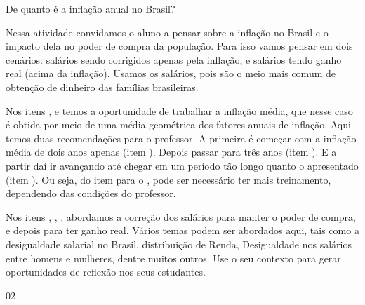 \begin{sugestions}{De quanto é a inflação anual no Brasil?}
{
Nessa atividade convidamos o aluno a pensar sobre a inflação no Brasil e o impacto dela no poder de compra da população. Para isso vamos pensar em dois cenários: salários sendo corrigidos apenas pela inflação, e salários tendo ganho real (acima da inflação). Usamos os salários, pois são o meio mais comum de obtenção de dinheiro das famílias brasileiras.

Nos itens ,  e  temos a oportunidade de trabalhar a inflação média, que nesse caso é obtida por meio de uma média geométrica dos fatores anuais de inflação. Aqui temos duas recomendações para o professor. A primeira é começar com a inflação média de dois anos apenas (item ). Depois passar para três anos (item ). E a partir daí ir avançando até chegar em um período tão longo quanto o apresentado (item ). Ou seja, do item  para o , pode ser necessário ter mais treinamento, dependendo das condições do professor. 

Nos itens , , , abordamos a correção dos salários para manter o poder de compra, e depois para ter ganho real.  Vários temas podem ser abordados aqui, tais como a desigualdade salarial no Brasil, distribuição de Renda, Desigualdade nos salários entre homens e mulheres, dentre muitos outros. Use o seu contexto para gerar oportunidades de reflexão nos seus estudantes. 

}{0}{2}
\end{sugestions}

